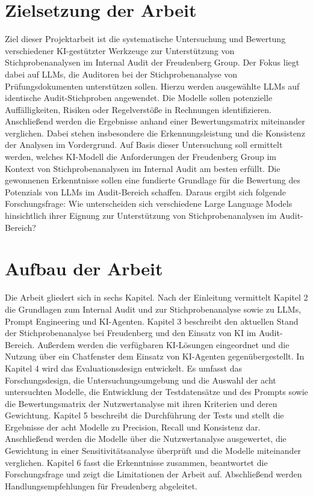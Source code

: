 \section{Zielsetzung der Arbeit}
Ziel dieser Projektarbeit ist die systematische Untersuchung und Bewertung verschiedener \ac{KI}-gestützter Werkzeuge zur Unterstützung von Stichprobenanalysen im Internal Audit der Freudenberg Group. Der Fokus liegt dabei auf \acp{LLM}, die Auditoren bei der Stichprobenanalyse von Prüfungsdokumenten unterstützen sollen. Hierzu werden ausgewählte \acp{LLM} auf identische Audit-Stichproben angewendet. Die Modelle sollen potenzielle Auffälligkeiten, Risiken oder Regelverstöße in Rechnungen identifizieren. Anschließend werden die Ergebnisse anhand einer Bewertungsmatrix miteinander verglichen. Dabei stehen insbesondere die Erkennungsleistung und die Konsistenz der Analysen im Vordergrund. Auf Basis dieser Untersuchung soll ermittelt werden, welches \ac{KI}-Modell die Anforderungen der Freudenberg Group im Kontext von Stichprobenanalysen im Internal Audit am besten erfüllt. Die gewonnenen Erkenntnisse sollen eine fundierte Grundlage für die Bewertung des Potenzials von \acp{LLM} im Audit-Bereich schaffen. Daraus ergibt sich folgende Forschungsfrage: Wie unterscheiden sich verschiedene Large Language Models hinsichtlich ihrer Eignung zur Unterstützung von Stichprobenanalysen im Audit-Bereich?

\section{Aufbau der Arbeit}

Die Arbeit gliedert sich in sechs Kapitel. Nach der Einleitung vermittelt Kapitel 2 die Grundlagen zum Internal Audit und zur Stichprobenanalyse sowie zu \acp{LLM}, Prompt Engineering und \ac{KI}-Agenten. Kapitel 3 beschreibt den aktuellen Stand der Stichprobenanalyse bei Freudenberg und den Einsatz von \ac{KI} im Audit-Bereich. Außerdem werden die verfügbaren \ac{KI}-Lösungen eingeordnet und die Nutzung über ein Chatfenster dem Einsatz von \ac{KI}-Agenten gegenübergestellt. In Kapitel 4 wird das Evaluationsdesign entwickelt. Es umfasst das Forschungsdesign, die Untersuchungsumgebung und die Auswahl der acht untersuchten Modelle, die Entwicklung der Testdatensätze und des Prompts sowie die Bewertungsmatrix der Nutzwertanalyse mit ihren Kriterien und deren Gewichtung. Kapitel 5 beschreibt die Durchführung der Tests und stellt die Ergebnisse der acht Modelle zu Precision, Recall und Konsistenz dar. Anschließend werden die Modelle über die Nutzwertanalyse ausgewertet, die Gewichtung in einer Sensitivitätsanalyse überprüft und die Modelle miteinander verglichen. Kapitel 6 fasst die Erkenntnisse zusammen, beantwortet die Forschungsfrage und zeigt die Limitationen der Arbeit auf. Abschließend werden Handlungsempfehlungen für Freudenberg abgeleitet.